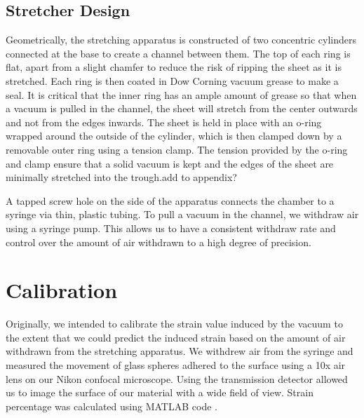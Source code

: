 \subsection{Stretcher Design}
Geometrically, the stretching apparatus is constructed of two concentric cylinders connected at the base to create a channel between them. The top of each ring is flat, apart from a slight chamfer to reduce the risk of ripping the sheet as it is stretched. Each ring is then coated in Dow Corning vacuum grease to make a seal. It is critical that the inner ring has an ample amount of grease so that when a vacuum is pulled in the channel, the sheet will stretch from the center outwards  and not from the edges inwards. The sheet is held in place with an o-ring wrapped around the outside of the cylinder, which is then clamped down by a removable outer ring using a tension clamp. The tension provided by the o-ring and clamp ensure that a solid vacuum is kept and the edges of the sheet are minimally stretched into the trough.add to appendix?  


A tapped screw hole on the side of the apparatus connects the chamber to a syringe via thin, plastic tubing. To pull a vacuum in the channel, we withdraw air using a syringe pump. This allows us to have a consistent withdraw rate and control over the amount of air withdrawn to a high degree of precision.

\section{Calibration}
Originally, we intended to calibrate the strain value induced by the vacuum to the extent that we could predict the induced strain based on the amount of air withdrawn from the stretching apparatus. We withdrew air from the syringe and measured the movement of glass spheres adhered to the surface using a 10x air lens on our Nikon confocal microscope. Using the transmission detector allowed us to image the surface of our material with a wide field of view. Strain percentage was calculated using MATLAB code \cite{xu2017direct} .

